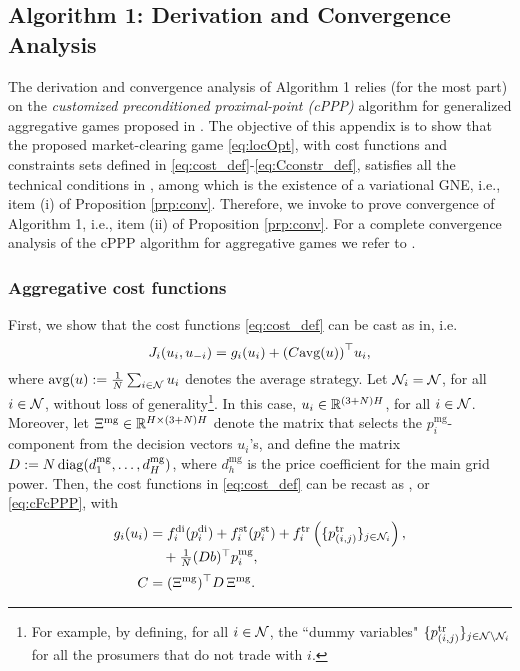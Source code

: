 \appendix%
\subsection{Algorithm 1: Derivation and Convergence Analysis}
\label{app:CA}
The derivation and convergence analysis of Algorithm 1 relies (for the most part) on the \textit{customized preconditioned proximal-point (cPPP)} algorithm for generalized aggregative games proposed in \cite[Algorithm~6]{belgioioso2020semi}. The objective of this appendix is to show that the proposed market-clearing game \eqref{eq:locOpt}, with cost functions and constraints sets defined in \eqref{eq:cost_def}-\eqref{eq:Cconstr_def}, satisfies all the technical conditions in \cite[Theorem~2]{belgioioso2020semi}, among which is the existence of a variational GNE, i.e., item (i) of Proposition \ref{prp:conv}. Therefore, we invoke \cite[Theorem~2]{belgioioso2020semi} to prove convergence of Algorithm 1, i.e., item (ii) of Proposition \ref{prp:conv}. For a complete convergence analysis of the cPPP algorithm for aggregative games we refer to \cite[Appendix~C]{belgioioso2020semi}.

\smallskip
\subsubsection*{Aggregative cost functions} First, we show that the cost functions \eqref{eq:cost_def} can be cast as in\cite[Eqn.~(30)]{belgioioso2020semi}, i.e.
\begin{equation}
	\label{eq:cFcPPP}
	J_i(u_i, u_{-i}) = g_i(u_i) + {(C \textrm{avg}( u))}^\top u_i,
\end{equation}
where $\textrm{avg}( u) := \frac{1}{N}\sum_{i \in \mathcal N} u_i$ denotes the average strategy.
Let $\mathcal N_i = \mathcal N$, for all $i \in \mathcal N$, without loss of generality\footnote{For example, by defining, for all $i \in \mathcal N$, the ``dummy variables" $\{p^{\text{tr}}_{(i,j)}\}_{j \in \mathcal N \setminus {\mathcal N_i}}$ for all the prosumers that do not trade with $i$.}. In this case, $u_i \in \mathbb R^{(3+N)H}$, for all $i \in \mathcal N$. Moreover, let $\Xi^{\text{mg}} \in \mathbb R^{H \times (3+N)H}$ denote the matrix that selects the $p_{i}^{\text{mg}}$-component from the decision vectors $u_i$'s, and define the matrix $D:= N \operatorname{diag}(d^{\text{mg}}_1, \ldots, d^{\text{mg}}_H)$, where $d^{\text{mg}}_h$ is the price coefficient for the main grid power. Then, the cost functions in \eqref{eq:cost_def} can be recast as \cite[Eqn.~(30)]{belgioioso2020semi}, or \eqref{eq:cFcPPP}, with
\begin{subequations}
	\label{eq:pieces_cPPP}
	\begin{align}
		g_i(u_i) &= \nonumber
		f_{i}^{\mathrm{di}}(p_{i}^{\mathrm{di}}) + f_{i}^{\mathrm{st}}(p_{i}^{\mathrm{st}})+ f_{i}^{\mathrm{tr}} \left( \{ p_{(i,j)}^{\mathrm{tr}} \}_{j \in \mathcal N_i} \right),\\[-.2em]
		\label{eq:gi_cPPP}
		&
		\textstyle
		\quad +\frac{1}{N}(Db)^\top p_i^{\text{mg}},\\[.2em]
		C &= (\Xi^{\text{mg}})^\top D \, \Xi^{\text{mg}}.
		\label{eq:C_cPPP}
	\end{align}
\end{subequations}


